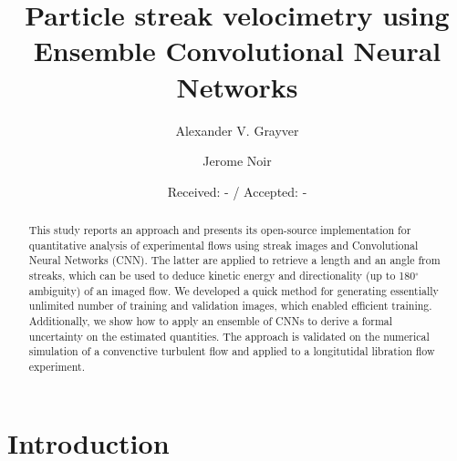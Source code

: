 \documentclass{svjour3}                     %
\begin{document}
\title{Particle streak velocimetry using Ensemble Convolutional Neural Networks}

\author{Alexander V. Grayver         \and
        Jerome Noir
}


\date{Received: - / Accepted: -}


\maketitle

\begin{abstract}
This study reports an approach and presents its open-source implementation for quantitative analysis of experimental flows using streak images and Convolutional Neural Networks (CNN). The latter are applied to retrieve a length and an angle from streaks, which can be used to deduce kinetic energy and directionality (up to 180$^{\circ}$ ambiguity) of an imaged flow. We developed a quick method for generating essentially unlimited number of training and validation images, which enabled efficient training. Additionally, we show how to apply an ensemble of CNNs to derive a formal uncertainty on the estimated quantities. The approach is validated on the numerical simulation of a convenctive turbulent flow and applied to a longitutidal libration flow experiment.
\end{abstract}

\section{Introduction}
\label{sec:intro}
\end{document}
